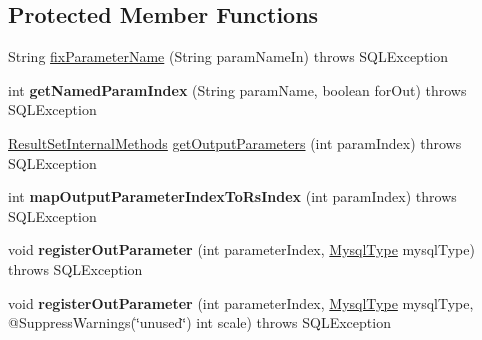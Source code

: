 \subsection*{Protected Member Functions}
\begin{DoxyCompactItemize}
\item 
String \mbox{\hyperlink{classcom_1_1mysql_1_1cj_1_1jdbc_1_1_callable_statement_a1ef44aef1842ec7c4affb25b0baba1d7}{fix\+Parameter\+Name}} (String param\+Name\+In)  throws S\+Q\+L\+Exception 
\item 
\mbox{\label{classcom_1_1mysql_1_1cj_1_1jdbc_1_1_callable_statement_a72e0a1ec0c24599bb2d3ee4f52ec616c}} 
int {\bfseries get\+Named\+Param\+Index} (String param\+Name, boolean for\+Out)  throws S\+Q\+L\+Exception 
\item 
\mbox{\hyperlink{interfacecom_1_1mysql_1_1cj_1_1jdbc_1_1result_1_1_result_set_internal_methods}{Result\+Set\+Internal\+Methods}} \mbox{\hyperlink{classcom_1_1mysql_1_1cj_1_1jdbc_1_1_callable_statement_af73a9e62e30b97e9b02f519a09749fbf}{get\+Output\+Parameters}} (int param\+Index)  throws S\+Q\+L\+Exception 
\item 
\mbox{\label{classcom_1_1mysql_1_1cj_1_1jdbc_1_1_callable_statement_a8aa76ccabbeebdb8c0430151845e6495}} 
int {\bfseries map\+Output\+Parameter\+Index\+To\+Rs\+Index} (int param\+Index)  throws S\+Q\+L\+Exception 
\item 
\mbox{\label{classcom_1_1mysql_1_1cj_1_1jdbc_1_1_callable_statement_affc71b6220a237feb94f842a2347d1da}} 
void {\bfseries register\+Out\+Parameter} (int parameter\+Index, \mbox{\hyperlink{enumcom_1_1mysql_1_1cj_1_1_mysql_type}{Mysql\+Type}} mysql\+Type)  throws S\+Q\+L\+Exception 
\item 
\mbox{\label{classcom_1_1mysql_1_1cj_1_1jdbc_1_1_callable_statement_af0005c4b8cc3fc565a380073c5a095d1}} 
void {\bfseries register\+Out\+Parameter} (int parameter\+Index, \mbox{\hyperlink{enumcom_1_1mysql_1_1cj_1_1_mysql_type}{Mysql\+Type}} mysql\+Type, @Suppress\+Warnings(\char`\"{}unused\char`\"{}) int scale)  throws S\+Q\+L\+Exception 
\item 
\mbox{\label{classcom_1_1mysql_1_1cj_1_1jdbc_1_1_callable_statement_adfc6052606e5e137e89a1c9af6e61b99}} 

\end{DoxyCompactItemize}
